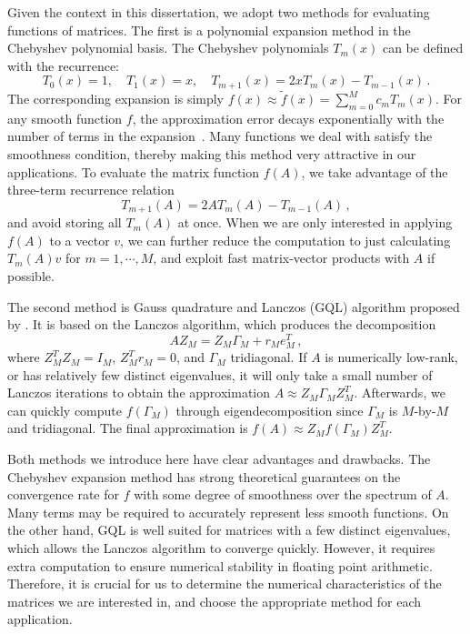 Given the context in this dissertation, we adopt two methods for evaluating
functions of matrices. The first is a polynomial expansion method in the
Chebyshev polynomial basis. The Chebyshev polynomials $T_m(x)$ can be defined
with the recurrence:
\begin{equation}\label{eqn:cheb_3term}
	T_0(x) = 1,\quad T_1(x) = x,\quad T_{m+1}(x) = 2xT_m(x) - T_{m-1}(x)\,.
\end{equation}
The corresponding expansion is simply $f(x) \approx \tilde{f}(x)= \sum_
{m=0}^Mc_mT_m(x)$. For any smooth function $f$, the approximation error decays
exponentially with the number of terms in the expansion~\cite{
Trefethen-2013-ATAP}. Many functions we deal with satisfy the smoothness
condition, thereby making this method very attractive in our applications. To
evaluate the matrix function $f(A)$, we take advantage of the three\hyp{}term
recurrence relation
\begin{equation}\label{eqn:3term_fom}
	T_{m+1}(A) = 2AT_m(A)-T_{m-1}(A)\,,
\end{equation}
and avoid storing all $T_m(A)$ at once. When we are only interested in applying
$f(A)$ to a vector $v$, we can further reduce the computation to just
calculating $T_m(A)v$ for $m = 1,\cdots, M$, and exploit fast matrix\hyp{}vector
products with $A$ if possible.

The second method is Gauss quadrature and Lanczos (GQL) algorithm proposed by 
\citet{golub1997matrices}. It is based on the Lanczos algorithm, which produces
the decomposition
\begin{equation}\label{eqn:lan_decomp}
	AZ_M = Z_M\Gamma_M + r_Me_M^T\,,
\end{equation}
where $Z_M^TZ_M = I_M$, $Z_M^Tr_M = 0$, and $\Gamma_M$ tridiagonal. If $A$ is
numerically low\hyp{}rank, or has relatively few distinct eigenvalues, it will
only take a small number of Lanczos iterations to obtain the approximation
$A\approx Z_M\Gamma_MZ_M^T$. Afterwards, we can quickly compute $f(\Gamma_M)$
through eigendecomposition since $\Gamma_M$ is $M$\hyp{}by\hyp{}$M$ and
tridiagonal. The final approximation is $f(A) \approx Z_Mf(\Gamma_M)Z_M^T$.

Both methods we introduce here have clear advantages and drawbacks. The
Chebyshev expansion method has strong theoretical guarantees on the convergence
rate for $f$ with some degree of smoothness over the spectrum of $A$. Many terms
may be required to accurately represent less smooth functions. On the other
hand, GQL is well suited for matrices with a few distinct eigenvalues, which
allows the Lanczos algorithm to converge quickly. However, it requires extra
computation to ensure numerical stability in floating point arithmetic.
Therefore, it is crucial for us to determine the numerical characteristics of
the matrices we are interested in, and choose the appropriate method for each
application.

